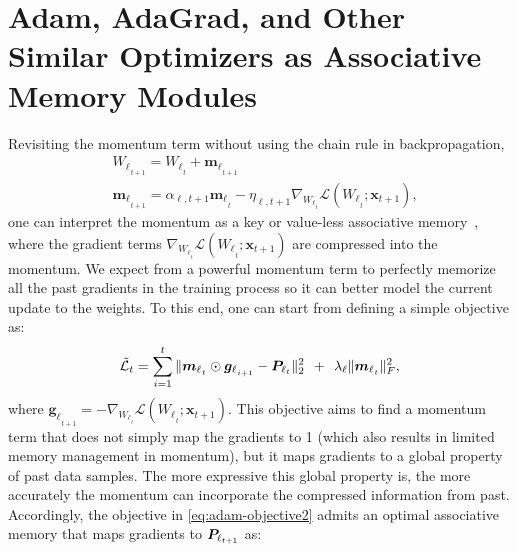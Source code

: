 \section{Adam, AdaGrad, and Other Similar Optimizers as Associative Memory Modules}\label{app:adam}
Revisiting the momentum term without using the chain rule in backpropagation,
\begin{align}\nonumber
    &{W_{\ell}}_{_{t+1}} = {W_{\ell}}_{_{t}} + {\boldsymbol{m}_{\ell}}_{_{t+1}}\\ \label{eq:momentum2}
    &{\boldsymbol{m}_{\ell}}_{_{t+1}} = \alpha_{\ell, t+1} {\boldsymbol{m}_{\ell}}_{_{t}} - \eta_{\ell, t+1} \nabla_{{W_{\ell}}_{_{t}}} \mathcal{L}\left({W_{\ell}}_{_{t}}; \boldsymbol{x}_{t+1}\right), 
\end{align}
one can interpret the momentum as a key or value-less associative memory~\citep[see Section 5]{behrouz2025Miras}, where the gradient terms $\nabla_{{W_{\ell}}_{_{t}}} \mathcal{L}\left({W_{\ell}}_{_{t}}; \boldsymbol{x}_{t+1}\right)$ are compressed into the momentum. We expect from a powerful momentum term to perfectly memorize all the past gradients in the training process so it can better model the current update to the weights. To this end, one can  start from  defining a simple objective as:
\begin{align}\label{eq:adam-objective2}
    \tilde{\mathcal{L}}_t = \sum_{i = 1}^{t} \| {\boldsymbol{m}_{\ell}}_{_{t}}  \odot {\boldsymbol{g}_{\ell}}_{_{i + 1}} - \boldsymbol{P}_{\ell_{t}} \|_{2}^{2} \:\: +\:\: \lambda_{\ell} \|{\boldsymbol{m}_{\ell}}_{_{t}}\|^2_F ,
\end{align}
where ${\boldsymbol{g}_{\ell}}_{_{t + 1}} = - \nabla_{{W_{\ell}}_{_{t}}} \mathcal{L}\left({W_{\ell}}_{_{t}}; \boldsymbol{x}_{t+1}\right)$. This objective aims to find a momentum term that does not simply map the gradients to 1 (which also results in limited memory management in momentum), but it maps gradients to a global property of past data samples. The more expressive this global property is, the more accurately the momentum can incorporate the compressed information from past. Accordingly, the objective in \autoref{eq:adam-objective2} admits an optimal associative memory that maps gradients to $\boldsymbol{P}_{\ell_{t+1}}$ as:
